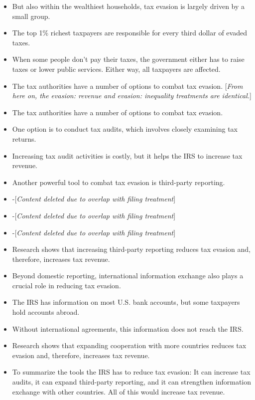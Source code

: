 \documentclass[11pt]{article}
\begin{document}
\begin{itemize}
    \item But also within the wealthiest households, tax evasion is largely driven by a small group. 
    \item The top 1\% richest taxpayers are responsible for every third dollar of evaded taxes.  
    \item When some people don’t pay their taxes, the government either has to raise taxes or lower public services. Either way, all taxpayers are affected.
    \item The tax authorities have a number of options to combat tax evasion. [\textit{From here on, the evasion: revenue and evasion: inequality treatments are identical.}]
    \item The tax authorities have a number of options to combat tax evasion.
    \item One option is to conduct tax audits, which involves closely examining tax returns.
    \item Increasing tax audit activities is costly, but it helps the IRS to increase tax revenue.
    \item Another powerful tool to combat tax evasion is third-party reporting. 
    \item -[\textit{Content deleted due to overlap with filing treatment}]
    \item -[\textit{Content deleted due to overlap with filing treatment}]
    \item -[\textit{Content deleted due to overlap with filing treatment}]
    \item Research shows that increasing third-party reporting reduces tax evasion and, therefore, increases tax revenue.
    \item Beyond domestic reporting, international information exchange also plays a crucial role in reducing tax evasion. 
    \item The IRS has information on most U.S. bank accounts, but some taxpayers hold accounts abroad.
    \item Without international agreements, this information does not reach the IRS.
    \item Research shows that expanding cooperation with more countries reduces tax evasion and, therefore, increases tax revenue.
    \item To summarize the tools the IRS has to reduce tax evasion: It can increase tax audits, it can expand third-party reporting, and it can strengthen information exchange with other countries. All of this would increase tax revenue.
\end{itemize}
\end{document}
